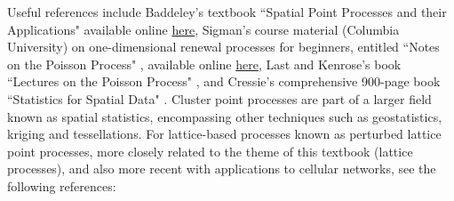 \documentclass[10pt]{article}
\begin{document}
Useful references include Baddeley's textbook ``Spatial Point Processes and their Applications" \cite{baddeley} available
online \href{https://www.apps.stat.vt.edu/leman/VTCourses/BaddeleyPointProcesses.pdf}{here},
Sigman's course material (Columbia University) on one-dimensional \textcolor{index}{renewal processes} for beginners, entitled ``Notes on the Poisson Process" \cite{karl}, available online \href{http://www.columbia.edu/~ks20/stochastic-I/stochastic-I-PP.pdf}{here},
Last and Kenrose's book ``Lectures on the Poisson Process" \cite{campoi}, and Cressie's comprehensive 900-page book ``Statistics for Spatial Data" \cite{cressie}. Cluster point processes are part of a larger field known as
\textcolor{index}{spatial statistics},
encompassing other techniques such as geostatistics, kriging and tessellations. For lattice-based processes known as
\textcolor{index}{perturbed lattice point processes}, more closely related to the theme of this textbook (lattice processes), and also more recent with applications to cellular networks, see the following references:
\end{document}
